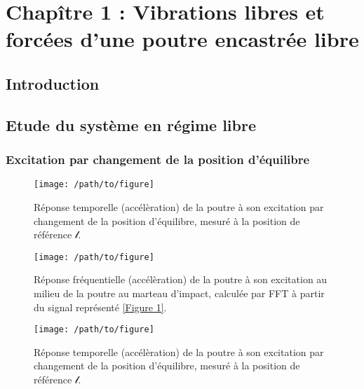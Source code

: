 \documentclass[10pt,a4paper, french]{article}
\begin{document}
\newpage


%



\section{Chapître 1 : Vibrations libres et forcées d'une poutre encastrée libre}

\subsection{Introduction}
\subsection{Etude du système en régime libre}





\subsubsection{Excitation par changement de la position d'équilibre}

\begin{figure}
  \texttt{[image: /path/to/figure]}
  \caption{Réponse temporelle (accélèration) de la poutre à son excitation par changement de la position d'équilibre, mesuré à la position de référence $\mathcal{l}$.}
  \label{Figure 1}
\end{figure}

\begin{figure}
  \texttt{[image: /path/to/figure]}
  \caption{Réponse fréquentielle (accélèration) de la poutre à son excitation au milieu de la poutre au marteau d'impact, calculée par FFT à partir du signal représenté \vref{Figure 1}.}
  \label{Figure 2}
\end{figure}





\begin{figure}
  \texttt{[image: /path/to/figure]}
  \caption{Réponse temporelle (accélèration) de la poutre à son excitation par changement de la position d'équilibre, mesuré à la position de référence $\mathcal{l}$.}
  \label{Figure 3}
\end{figure}
\end{document}
